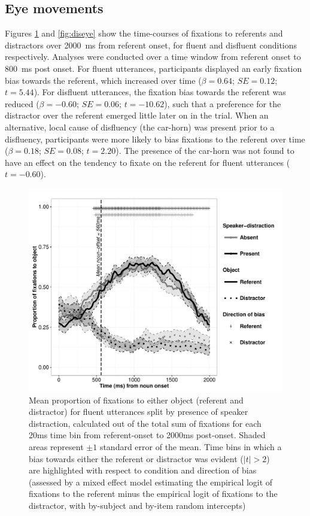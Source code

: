 \documentclass[a4paper,man,natbib]{apa6}
\newcommand*{\SE}{\mathit{SE}} %
\begin{document}
\subsection{Eye movements}
Figures \ref{fig:flueye} and \ref{fig:diseye} show the time-courses of fixations to referents and distractors over 2000~ms from referent onset, for fluent and disfluent conditions respectively.
Analyses were conducted over a time window from referent onset to 800~ms post onset.
For fluent utterances, participants displayed an early fixation bias towards the referent, which increased over time ($\beta = 0.64$; $\SE = 0.12$; $t=5.44$). 
For disfluent utterances, the fixation bias towards the referent was reduced ($\beta = -0.60$; $\SE = 0.06$; $t=-10.62$), such that a preference for the distractor over the referent emerged little later on in the trial.
When an alternative, local cause of disfluency (the car-horn) was present prior to a disfluency, participants were more likely to bias fixations to the referent over time ($\beta = 0.18$; $\SE = 0.08$; $t=2.20$).
The presence of the car-horn was not found to have an effect on the tendency to fixate on the referent for fluent utterances ($t=-0.60$).

\begin{figure}[Ht]
  \centering
	\includegraphics[width=\linewidth]{eye_fl.pdf}
  \caption{Mean proportion of fixations to either object (referent and distractor) for fluent utterances split by presence of speaker distraction, calculated out of the total sum of fixations for each 20ms time bin from referent-onset to 2000ms post-onset. Shaded areas represent $\pm 1$ standard error of the mean. Time bins in which a bias towards either the referent or distractor was evident ($|t|>2$) are highlighted with respect to condition and direction of bias (assessed by a mixed effect model estimating the empirical logit of fixations to the referent minus the empirical logit of fixations to the distractor, with by-subject and by-item random intercepts)}
  \label{fig:flueye}
\end{figure}
\end{document}
